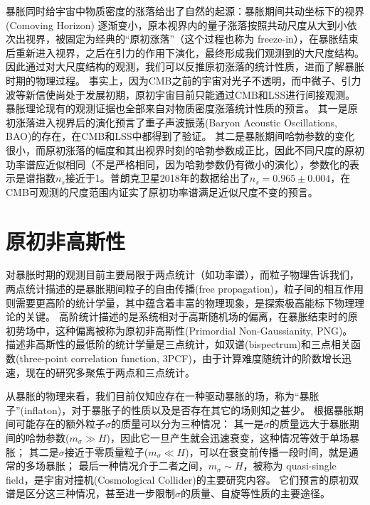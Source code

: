 暴胀同时给宇宙中物质密度的涨落给出了自然的起源：暴胀期间共动坐标下的视界 (Comoving Horizon) 逐渐变小，原本视界内的量子涨落按照共动尺度从大到小依次出视界，被固定为经典的“原初涨落”（这个过程也称为 freeze-in），在暴胀结束后重新进入视界，之后在引力的作用下演化，最终形成我们观测到的大尺度结构。
因此通过对大尺度结构的观测，我们可以反推原初涨落的统计性质，进而了解暴胀时期的物理过程。
事实上，因为CMB之前的宇宙对光子不透明，而中微子、引力波等新信使尚处于发展初期，原初宇宙目前只能通过CMB和LSS进行间接观测。
暴胀理论现有的观测证据也全部来自对物质密度涨落统计性质的预言。%
其一是原初涨落进入视界后的演化预言了重子声波振荡(Baryon Acoustic Oscillations, BAO)的存在，在CMB和LSS中都得到了验证。
其二是暴胀期间哈勃参数的变化很小，而原初涨落的幅度和其出视界时刻的哈勃参数成正比，因此不同尺度的原初功率谱应近似相同（不是严格相同，因为哈勃参数仍有微小的演化），参数化的表示是谱指数$n_s$接近于1。普朗克卫星2018年的数据给出了$n_s=0.965\pm0.004$\cite{planck18}，在CMB可观测的尺度范围内证实了原初功率谱满足近似尺度不变的预言。

\section{原初非高斯性} %

对暴胀时期的观测目前主要局限于两点统计（如功率谱），而粒子物理告诉我们，两点统计描述的是暴胀期间粒子的自由传播(free propagation)，粒子间的相互作用则需要更高阶的统计学量，其中蕴含着丰富的物理现象，是探索极高能标下物理理论的关键\cite{meerburg2019PNG}。
高阶统计描述的是系统相对于高斯随机场的偏离，在暴胀结束时的原初势场中，这种偏离被称为原初非高斯性(Primordial Non-Gaussianity, PNG)。
描述非高斯性的最低阶的统计学量是三点统计，如双谱(bispectrum)和三点相关函数(three-point correlation function, 3PCF)，由于计算难度随统计的阶数增长迅速，现在的研究多聚焦于两点和三点统计。

从暴胀的物理来看，我们目前仅知应存在一种驱动暴胀的场，称为“暴胀子”(inflaton)，对于暴胀子的性质以及是否存在其它的场则知之甚少。
根据暴胀期间可能存在的额外粒子$\sigma$的质量可以分为三种情况：
其一是$\sigma$的质量远大于暴胀期间的哈勃参数($m_\sigma \gg H$)，因此它一旦产生就会迅速衰变，这种情况等效于单场暴胀；
其二是$\sigma$接近于零质量粒子($m_\sigma \ll H$)，可以在衰变前传播一段时间，就是通常的多场暴胀；
最后一种情况介于二者之间，$m_\sigma \sim H$，被称为 quasi-single field\cite{chen2010quasingle}，是宇宙对撞机(Cosmological Collider)的主要研究内容\cite{arkani-hamed2015coco}。
它们预言的原初双谱是区分这三种情况，甚至进一步限制$\sigma$的质量、自旋等性质的主要途径。

